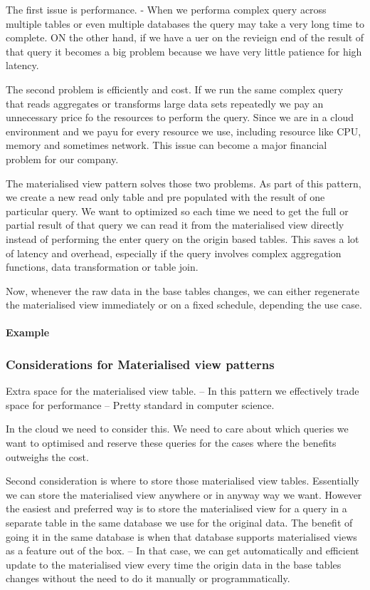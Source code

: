 \documentclass[a4paper, 11pt]{book}
\begin{document}
    The first issue is performance.
    - When we performa complex query across multiple tables or even multiple databases the query may take a very long time to complete.
    ON the other hand, if we have a uer on the revieign end of the result of that query it becomes a big problem because we have very little patience for high latency.

    The second problem is efficiently and cost.
    If we run the same complex query that reads aggregates or transforms large data sets repeatedly we pay an unnecessary price fo the resources to perform the query.
    Since we are in a cloud environment and we payu for every resource we use, including resource like CPU, memory and sometimes network.
    This issue can become a major financial problem for our company.

    The materialised view pattern solves those two problems.
    As part of this pattern, we create a new read only table and pre populated with the result of one particular query.
    We want to optimized so each time we need to get the full or partial result of that query we can read it from the materialised view directly instead of performing the enter query on the origin based tables.
    This saves a lot of latency and overhead, especially if the query involves complex aggregation functions, data transformation or table join.

    Now, whenever the raw data in the base tables changes, we can either regenerate the materialised view immediately or on a fixed schedule, depending the use case.

    \paragraph{Example}

    \subsubsection{Considerations for Materialised view patterns}
    Extra space for the materialised view table.
    -- In this pattern we effectively trade space for performance
    -- Pretty standard in computer science.

    In the cloud we need to consider this.
    We need to care about which queries we want to optimised and reserve these queries for the cases where the benefits outweighs the cost.

    Second consideration is where to store those materialised view tables.
    Essentially we can store the materialised view anywhere or in anyway way we want.
    However the easiest and preferred way is to store the materialised view for a query in a separate table in the same database we use for the original data.
    The benefit of going it in the same database is when that database supports materialised views as a feature out of the box.
    -- In that case, we can get automatically and efficient update to the materialised view every time the origin data in the base tables changes without the need to do it manually or programmatically.
\end{document}
